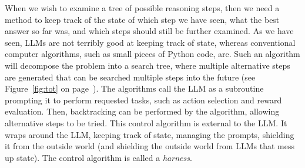 When we wish to examine a tree of possible reasoning steps, then we need a method to keep track of the state of which step we have seen, what the best answer so far was, and which steps should still be further examined. As we have seen, LLMs are not terribly good at keeping track of state, whereas conventional computer algorithms, such as small pieces of Python code, are. 
%
%
Such an algorithm will decompose the problem into a search tree, where multiple alternative steps are
generated that can be searched multiple steps into the future (see Figure~\ref{fig:tot} on page~\pageref{fig:tot}). The  algorithms call the LLM as a subroutine prompting it to perform requested tasks, such as action selection and reward evaluation.  Then, backtracking can be performed by the algorithm, allowing alternative steps to be tried. This control algorithm is external to the LLM. It wraps around the LLM, keeping track of state, managing the prompts, shielding it from the outside world (and shielding the outside world from LLMs that mess up state). The control algorithm is called a {\em harness}. 
%

